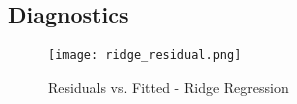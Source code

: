 \documentclass[11pt]{article}
\begin{document}
\subsection{Diagnostics}
\label{appendix:diagnostics}

\begin{figure}[H]
\centering
\begin{minipage}{.5\textwidth}
  \centering
  \texttt{[image: ridge\_residual.png]}
   \caption{Residuals vs. Fitted - Ridge Regression}
   \label{fig:residuals_fitted_ridge_appendix}
\end{minipage}%
\end{figure}

\setlength{\parskip}{1em}
\end{document}
